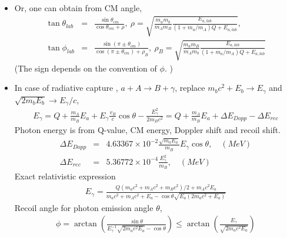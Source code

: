 \documentclass[10pt]{book}
\newcommand{\bea}{\begin{eqnarray}}
\newcommand{\eea}{\end{eqnarray}}
\newcommand{\no}{\nonumber \\}
\begin{document}
\begin{itemize}
	\item   
	Or, one can obtain from CM angle,
	\bea 
	\tan\theta_{lab}&=& \frac{\sin\theta_{cm}}{\cos\theta_{cm}+\rho},\ 
	\rho = \sqrt{\frac{m_a m_b}{m_A m_B}\frac{E_{a,lab}}{(1+m_a/m_A)Q+E_{a,lab} }},\no 
	\tan\phi_{lab} &=& \frac{\sin(\pi\pm \theta_{cm})}{\cos(\pi\pm \theta_{cm})+\rho_B},\ 
	\rho_B = \sqrt{\frac{m_a m_B}{m_A m_b}\frac{E_{a,lab}}{(1+m_a/m_A)Q+E_{a,lab} }}
	\eea 
	(The sign depends on the convention of $\phi$. )
	\item In case of radiative capture , $a+A\to B+\gamma$, replace
	$m_bc^2+E_b\to E_\gamma$ and  $\sqrt{2m_b E_b}\to E_\gamma/c$, 
	\bea 
	E_\gamma = Q+\frac{m_A}{m_B}E_a+E_\gamma\frac{v_B}{c}\cos\theta-\frac{E_\gamma^2}{2m_B c^2}
	         = Q+\frac{m_A}{m_B}E_a+\Delta E_{Dopp}-\Delta E_{rec} 
	\eea 
	Photon energy is from Q-value, CM energy, Doppler shift and recoil shift.
	\bea 
	\Delta E_{Dopp} &=& 4.63367\times 10^{-2} \frac{\sqrt{m_a E_a}}{m_B}E_\gamma \cos\theta, 
	  \quad (MeV) \no 
	\Delta E_{rec} &=& 5.36772\times 10^{-4} \frac{E_\gamma^2}{m_B},\quad (MeV)   
	\eea 
	Exact relativistic expression 
	\bea 
	E_\gamma = \frac{Q(m_a c^2+m_A c^2+m_B c^2)/2+m_A c^2 E_a}{
	                 m_a c^2 +m_A c^2 +E_a -\cos\theta\sqrt{E_a(2m_a c^2+E_a)} }
	\eea 
	Recoil angle for photon emission angle $\theta$,
	\bea 
	\phi = \arctan\left( \frac{\sin\theta}{E_\gamma^{-1}\sqrt{2m_a c^2 E_a}-\cos\theta}\right) 
	     \leq \arctan\left( \frac{E_\gamma}{\sqrt{2m_a c^2 E_a}} \right)   
	\eea 
\end{itemize}
\end{document}
